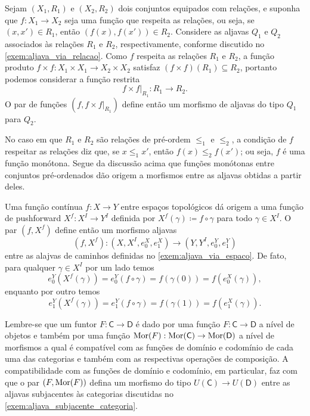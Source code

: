 \begin{exem}
    Sejam $(X_1,R_1)$ e $(X_2,R_2)$ dois conjuntos equipados com relações, e suponha que $f: X_1 \to X_2$ seja uma função que respeita as relações, ou seja, se $(x,x') \in R_1$, então $(f(x),f(x')) \in R_2$.
    Considere as aljavas $Q_1$ e $Q_2$ associados às relações $R_1$ e $R_2$, respectivamente, conforme discutido no \cref{exem:aljava_via_relacao}.
    Como $f$ respeita as relações $R_1$ e $R_2$, a função produto $f \times f: X_1 \times X_1 \to X_2 \times X_2$ satisfaz $(f \times f)(R_1) \subseteq R_2$, portanto podemos considerar a função restrita
    \begin{displaymath}
        f \times f \rvert_{R_1}: R_1 \to R_2.
    \end{displaymath}
    O par de funções $(f,f \times f\rvert_{R_1})$ define então um morfismo de aljavas do tipo $Q_1$ para $Q_2$.
    
    No caso em que $R_1$ e $R_2$ são relações de pré-ordem $\leq_1$ e $\leq_2$, a condição de $f$ respeitar as relações diz que, se $x \leq_1 x'$, então $f(x) \leq_2 f(x')$; ou seja, $f$ é uma função monótona.
    Segue da discussão acima que funções monótonas entre conjuntos pré-ordenados dão origem a morfismos entre as aljavas obtidas a partir deles.
\end{exem}

\begin{exem}
    Uma função contínua $f: X \to Y$ entre espaços topológicos dá origem a uma função de pushforward $X^f: X^I \to Y^{I}$ definida por $X^f(\gamma) \coloneqq f \circ \gamma$ para todo $\gamma \in X^{I}$.
    O par $(f,X^f)$ define então um morfismo aljavas
    \begin{displaymath}
        (f,X^f): (X,X^I,e^X_0,e^X_1) \to (Y,Y^I,e^Y_0,e^Y_1)
    \end{displaymath}
    entre as alajvas de caminhos definidas no \cref{exem:aljava_via_espaco}.
    De fato, para qualquer $\gamma \in X^I$ por um lado temos
    \begin{displaymath}
        e^Y_0(X^f(\gamma)) = e^Y_0(f \circ \gamma) = f(\gamma(0)) = f(e^X_0(\gamma)),
    \end{displaymath}
    enquanto por outro temos
    \begin{displaymath}
        e^Y_1(X^f(\gamma)) = e^Y_1(f \circ \gamma) = f(\gamma(1)) = f(e^X_1(\gamma)).
    \end{displaymath}
\end{exem}

\begin{exem}\label{exem:funtor_induz_morfismo_de_aljavas}
    Lembre-se que um funtor $F: \mathsf{C} \to \mathsf{D}$ é dado por uma função $F: \mathsf{C} \to \mathsf{D}$ a nível de objetos e também por uma função $\mathrm{Mor}(F): \mathrm{Mor}(\mathsf{C}) \to \mathrm{Mor}(\mathsf{D})$ a nível de morfismos a qual é compatível com as funções de domínio e codomínio de cada uma das categorias e também com as respectivas operações de composição.
    A compatibilidade com as funções de domínio e codomínio, em particular, faz com que o par $(F,\mathrm{Mor}(F))$ defina um morfismo do tipo $U(\mathsf{C}) \to U(\mathsf{D})$ entre as aljavas subjacentes às categorias discutidas no \cref{exem:aljava_subjacente_categoria}.
\end{exem}

